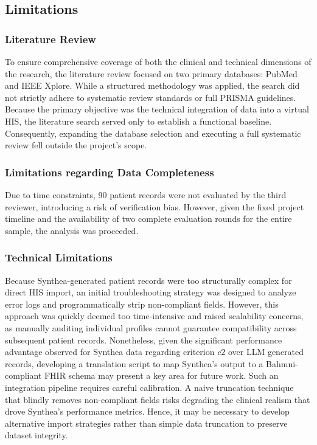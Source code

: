 \subsection*{Limitations}
\subsubsection{Literature Review}
To ensure comprehensive coverage of both the clinical and technical dimensions of the research, the literature review focused on two primary databases: PubMed and IEEE Xplore. While a structured methodology was applied, the search did not strictly adhere to systematic review standards or full PRISMA guidelines. Because the primary objective was the technical integration of data into a virtual HIS, the literature search served only to establish a functional baseline. Consequently, expanding the database selection and executing a full systematic review fell outside the project's scope.

\subsubsection{Limitations regarding Data Completeness}
Due to time constraints, 90 patient records were not evaluated by the third reviewer, introducing a risk of verification bias. However, given the fixed project timeline and the availability of two complete evaluation rounds for the entire sample, the analysis was proceeded. 

\subsubsection{Technical Limitations}
Because Synthea-generated patient records were too structurally complex for direct HIS import, an initial troubleshooting strategy was designed to analyze error logs and programmatically strip non-compliant fields. However, this approach was quickly deemed too time-intensive and raised scalability concerns, as manually auditing individual profiles cannot guarantee compatibility across subsequent patient records. Nonetheless, given the significant performance advantage observed for Synthea data regarding criterion $c2$ over LLM generated records, developing a translation script to map Synthea's output to a Bahmni-compliant FHIR schema may present a key area for future work. Such an integration pipeline requires careful calibration. A naive truncation technique that blindly removes non-compliant fields risks degrading the clinical realism that drove Synthea’s performance metrics. Hence, it may be necessary to develop alternative import strategies rather than simple data truncation to preserve dataset integrity.

